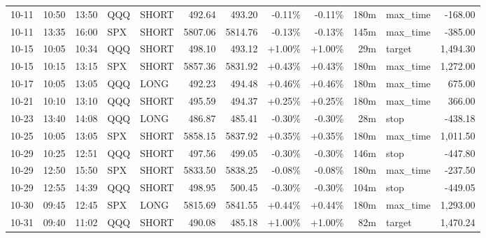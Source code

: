 \documentclass[11pt,a4paper,twoside]{article}
\begin{document}
\begin{center}
\begin{longtable}{>{\color{txtmain}}l l l l l r r r r r >{\color{txtmain}}l r}
10-11 & 10:50 & 13:50 & QQQ & SHORT & 492.64 & 493.20 & \textcolor{lossred}{-0.11\%} & \textcolor{lossred}{-0.11\%} & 180m & max\_time & \textcolor{lossred}{-168.00} \\
10-11 & 13:35 & 16:00 & SPX & SHORT & 5807.06 & 5814.76 & \textcolor{lossred}{-0.13\%} & \textcolor{lossred}{-0.13\%} & 145m & max\_time & \textcolor{lossred}{-385.00} \\
10-15 & 10:05 & 10:34 & QQQ & SHORT & 498.10 & 493.12 & \textcolor{wingreen}{+1.00\%} & \textcolor{wingreen}{+1.00\%} & 29m & target & \textcolor{wingreen}{1,494.30} \\
10-15 & 10:15 & 13:15 & SPX & SHORT & 5857.36 & 5831.92 & \textcolor{wingreen}{+0.43\%} & \textcolor{wingreen}{+0.43\%} & 180m & max\_time & \textcolor{wingreen}{1,272.00} \\
10-17 & 10:05 & 13:05 & QQQ & LONG & 492.23 & 494.48 & \textcolor{wingreen}{+0.46\%} & \textcolor{wingreen}{+0.46\%} & 180m & max\_time & \textcolor{wingreen}{675.00} \\
10-21 & 10:10 & 13:10 & QQQ & SHORT & 495.59 & 494.37 & \textcolor{wingreen}{+0.25\%} & \textcolor{wingreen}{+0.25\%} & 180m & max\_time & \textcolor{wingreen}{366.00} \\
10-23 & 13:40 & 14:08 & QQQ & LONG & 486.87 & 485.41 & \textcolor{lossred}{-0.30\%} & \textcolor{lossred}{-0.30\%} & 28m & stop & \textcolor{lossred}{-438.18} \\
10-25 & 10:05 & 13:05 & SPX & SHORT & 5858.15 & 5837.92 & \textcolor{wingreen}{+0.35\%} & \textcolor{wingreen}{+0.35\%} & 180m & max\_time & \textcolor{wingreen}{1,011.50} \\
10-29 & 10:25 & 12:51 & QQQ & SHORT & 497.56 & 499.05 & \textcolor{lossred}{-0.30\%} & \textcolor{lossred}{-0.30\%} & 146m & stop & \textcolor{lossred}{-447.80} \\
10-29 & 12:50 & 15:50 & SPX & SHORT & 5833.50 & 5838.25 & \textcolor{lossred}{-0.08\%} & \textcolor{lossred}{-0.08\%} & 180m & max\_time & \textcolor{lossred}{-237.50} \\
10-29 & 12:55 & 14:39 & QQQ & SHORT & 498.95 & 500.45 & \textcolor{lossred}{-0.30\%} & \textcolor{lossred}{-0.30\%} & 104m & stop & \textcolor{lossred}{-449.05} \\
10-30 & 09:45 & 12:45 & SPX & LONG & 5815.69 & 5841.55 & \textcolor{wingreen}{+0.44\%} & \textcolor{wingreen}{+0.44\%} & 180m & max\_time & \textcolor{wingreen}{1,293.00} \\
10-31 & 09:40 & 11:02 & QQQ & SHORT & 490.08 & 485.18 & \textcolor{wingreen}{+1.00\%} & \textcolor{wingreen}{+1.00\%} & 82m & target & \textcolor{wingreen}{1,470.24} \\

\end{longtable}
\end{center}
\end{document}
